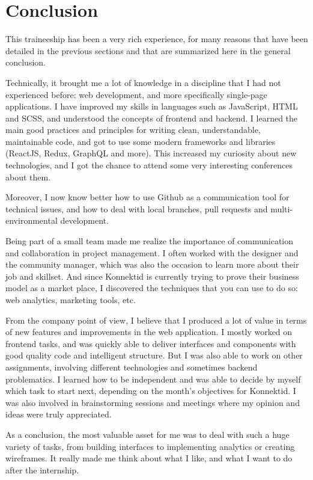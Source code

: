 \section{Conclusion}
\label{sec:conclusion}

This traineeship has been a very rich experience, for many reasons that have been detailed in the previous sections and that are summarized here in the general conclusion.

Technically, it brought me a lot of knowledge in a discipline that I had not experienced before: web development, and more specifically single-page applications. I have improved my skills in languages such as JavaScript, HTML and SCSS, and understood the concepts of frontend and backend. I learned the main good practices and principles for writing clean, understandable, maintainable code, and got to use some modern frameworks and libraries (ReactJS, Redux, GraphQL and more). This increased my curiosity about new technologies, and I got the chance to attend some very interesting conferences about them.

Moreover, I now know better how to use Github as a communication tool for technical issues, and how to deal with local branches, pull requests and multi-environmental development.

Being part of a small team made me realize the importance of communication and collaboration in project management. I often worked with the designer and the community manager, which was also the occasion to learn more about their job and skillset. And since Konnektid is currently trying to prove their business model as a market place, I discovered the techniques that you can use to do so: web analytics, marketing tools, etc.

From the company point of view, I believe that I produced a lot of value in terms of new features and improvements in the web application. I mostly worked on frontend tasks, and was quickly able to deliver interfaces and components with good quality code and intelligent structure. But I was also able to work on other assignments, involving different technologies and sometimes backend problematics. I learned how to be independent and was able to decide by myself which task to start next, depending on the month's objectives for Konnektid. I was also involved in brainstorming sessions and meetings where my opinion and ideas were truly appreciated.

As a conclusion, the most valuable asset for me was to deal with such a huge variety of tasks, from building interfaces to implementing analytics or creating wireframes. It really made me think about what I like, and what I want to do after the internship.